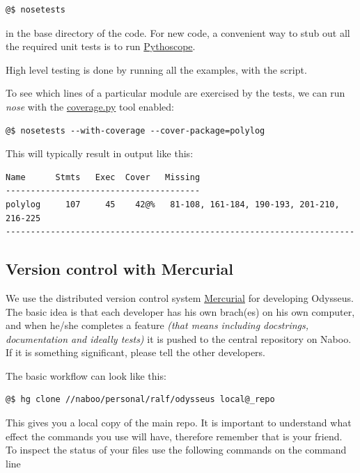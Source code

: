 \documentclass[letterpaper,10pt,english]{manual}
\begin{document}
\begin{Verbatim}[commandchars=@\[\]]
@$ nosetests
\end{Verbatim}

in the base directory of the code. For new code, a convenient way to stub out all the required unit tests is to run \href{http://pythoscope.org/}{Pythoscope}.

High level testing is done by running all the examples, with the  script.

To see which lines of a particular module are exercised by the tests, we can run \emph{nose} with the \href{http://somethingaboutorange.com/mrl/projects/nose/}{coverage.py} tool enabled:

\begin{Verbatim}[commandchars=@\[\]]
@$ nosetests --with-coverage --cover-package=polylog
\end{Verbatim}

This will typically result in output like this:

\begin{Verbatim}[commandchars=@\[\]]
Name      Stmts   Exec  Cover   Missing
---------------------------------------
polylog     107     45    42@%   81-108, 161-184, 190-193, 201-210, 216-225
----------------------------------------------------------------------
\end{Verbatim}


\subsection{Version control with Mercurial}

We use the distributed version control system \href{http://www.selenic.com/mercurial/wiki/}{Mercurial} for developing Odysseus. The basic idea is that each developer has his own brach(es) on his own computer, and when he/she completes a feature \emph{(that means including docstrings, documentation and ideally tests)} it is pushed to the central repository on Naboo. If it is something significant, please tell the other developers.

The basic workflow can look like this:

\begin{Verbatim}[commandchars=@\[\]]
@$ hg clone //naboo/personal/ralf/odysseus local@_repo
\end{Verbatim}

This gives you a local copy of the main repo. It is important to understand what effect the commands you use will have, therefore remember that  is your friend. To inspect the status of your files use the following commands on the command line
\end{document}

